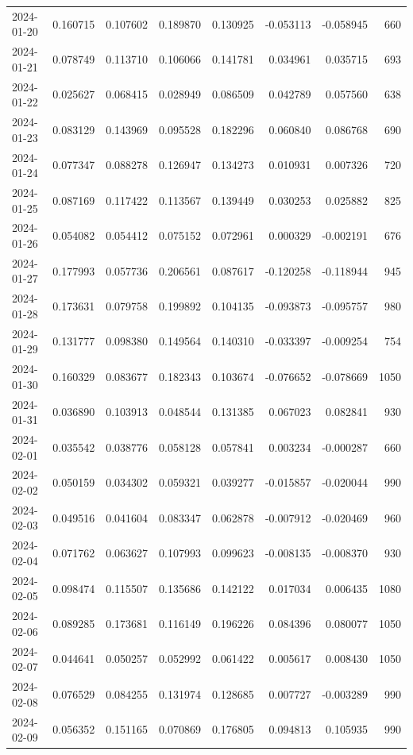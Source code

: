 \begin{tabular}{lrrrrrrr}
2024-01-20 & 0.160715 & 0.107602 & 0.189870 & 0.130925 & -0.053113 & -0.058945 & 660 \\
2024-01-21 & 0.078749 & 0.113710 & 0.106066 & 0.141781 & 0.034961 & 0.035715 & 693 \\
2024-01-22 & 0.025627 & 0.068415 & 0.028949 & 0.086509 & 0.042789 & 0.057560 & 638 \\
2024-01-23 & 0.083129 & 0.143969 & 0.095528 & 0.182296 & 0.060840 & 0.086768 & 690 \\
2024-01-24 & 0.077347 & 0.088278 & 0.126947 & 0.134273 & 0.010931 & 0.007326 & 720 \\
2024-01-25 & 0.087169 & 0.117422 & 0.113567 & 0.139449 & 0.030253 & 0.025882 & 825 \\
2024-01-26 & 0.054082 & 0.054412 & 0.075152 & 0.072961 & 0.000329 & -0.002191 & 676 \\
2024-01-27 & 0.177993 & 0.057736 & 0.206561 & 0.087617 & -0.120258 & -0.118944 & 945 \\
2024-01-28 & 0.173631 & 0.079758 & 0.199892 & 0.104135 & -0.093873 & -0.095757 & 980 \\
2024-01-29 & 0.131777 & 0.098380 & 0.149564 & 0.140310 & -0.033397 & -0.009254 & 754 \\
2024-01-30 & 0.160329 & 0.083677 & 0.182343 & 0.103674 & -0.076652 & -0.078669 & 1050 \\
2024-01-31 & 0.036890 & 0.103913 & 0.048544 & 0.131385 & 0.067023 & 0.082841 & 930 \\
2024-02-01 & 0.035542 & 0.038776 & 0.058128 & 0.057841 & 0.003234 & -0.000287 & 660 \\
2024-02-02 & 0.050159 & 0.034302 & 0.059321 & 0.039277 & -0.015857 & -0.020044 & 990 \\
2024-02-03 & 0.049516 & 0.041604 & 0.083347 & 0.062878 & -0.007912 & -0.020469 & 960 \\
2024-02-04 & 0.071762 & 0.063627 & 0.107993 & 0.099623 & -0.008135 & -0.008370 & 930 \\
2024-02-05 & 0.098474 & 0.115507 & 0.135686 & 0.142122 & 0.017034 & 0.006435 & 1080 \\
2024-02-06 & 0.089285 & 0.173681 & 0.116149 & 0.196226 & 0.084396 & 0.080077 & 1050 \\
2024-02-07 & 0.044641 & 0.050257 & 0.052992 & 0.061422 & 0.005617 & 0.008430 & 1050 \\
2024-02-08 & 0.076529 & 0.084255 & 0.131974 & 0.128685 & 0.007727 & -0.003289 & 990 \\
2024-02-09 & 0.056352 & 0.151165 & 0.070869 & 0.176805 & 0.094813 & 0.105935 & 990 \\

\end{tabular}
